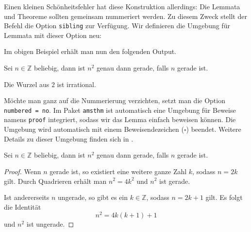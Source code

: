 Einen kleinen Schönheitsfehler hat diese Konstruktion allerdings: Die Lemmata und Theoreme sollten gemeinsam nummeriert werden. Zu diesem Zweck stellt der Befehl  die Option \texttt{sibling} zur Verfügung.
Wir definieren die Umgebung für Lemmata mit dieser Option neu:

\begin{example}
\end{example}

Im obigen Beispiel erhält man nun den folgenden Output.

\begin{LTXexample}[firstline=2]
\setcounter{thm}{0}
\begin{lem}
    Sei $n \in \mathbb Z$ 
    beliebig, dann ist $n^2$ 
    genau dann gerade, 
    falls $n$ gerade ist.
\end{lem}

\begin{thm}
    Die Wurzel aus $2$ ist 
    irrational.
\end{thm}
\end{LTXexample}

Möchte man ganz auf die Nummerierung verzichten, setzt man die Option \verb|numbered = no|.
Im Paket \texttt{amsthm} ist automatisch eine Umgebung für Beweise namens \texttt{proof} integriert, sodass wir das Lemma einfach beweisen können.
Die Umgebung wird automatisch mit einem Beweisendezeichen ($\square$) beendet.
Weitere Details zu dieser Umgebung finden sich in \cite{amsthm}.

\begin{LTXexample}[firstline=3]
\setcounter{thm}{0}
\setcounter{lem0}{0}
\begin{lem0}
    Sei $n \in \mathbb Z$ 
    beliebig, dann ist $n^2$ 
    genau dann gerade,
    falls $n$ gerade ist.
\end{lem0}

\begin{proof}
    Wenn $n$ gerade ist, 
    so existiert eine 
    weitere ganze Zahl $k$,
    sodass $n = 2 k$ gilt. 
    Durch Quadrieren erhält 
    man $n^2 = 4 k^2$ und 
    $n^2$ ist gerade.
    
    Ist andererseits $n$ 
    ungerade, so gibt es ein 
    $k \in \mathbb Z$, sodass 
    $n = 2 k + 1$ gilt. 
    Es folgt die Identität 
    \[n^2 = 4 k (k + 1) + 1\] 
    und $n^2$ ist ungerade.
\end{proof}
\end{LTXexample}


